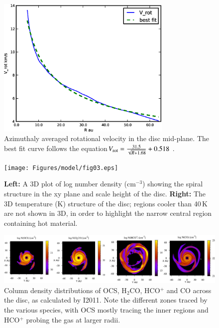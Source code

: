 \documentclass[useAMS,usenatbib]{mn2e}
\begin{document}
\begin{figure}
 \includegraphics[width=84mm]{Figures/model/fig02.eps}
 \caption{Azimuthaly averaged rotational velocity in the disc mid-plane. The best fit curve follows the equation$V_{\rm rot}=\frac{31.5}{\sqrt{R+1.68}}+0.518$ .}
 \label{velocity}
\end{figure}

\begin{figure}
 \texttt{[image: Figures/model/fig03.eps]}
 \caption{{\bf Left:} A 3D plot of log number density (cm$^{-3}$) showing the spiral structure in the xy plane and scale height of the disc. {\bf Right:} The 3D temperature (K) structure of the disc; regions cooler than 40$\,$K are not shown in 3D, in order to highlight the narrow central region containing hot material.}
 \label{rhoT} 
\end{figure}

\begin{figure}
 \includegraphics[width=168mm]{Figures/model/fig04.eps}
 \caption{Column density distributions of OCS, H$_2$CO, HCO$^+$ and CO across the disc, as calculated by I2011. Note the different zones traced by the various species, with OCS mostly tracing the inner regions and HCO$^+$ probing the gas at larger radii.}
 \label{Chemistry} 
\end{figure}
\end{document}
